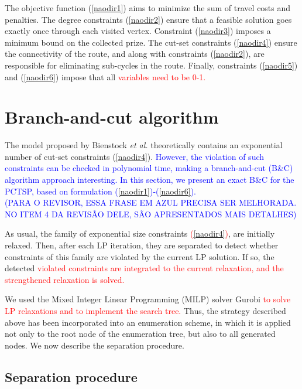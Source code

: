 \documentclass{ro}
\begin{document}
The objective function (\ref{naodir1}) aims to minimize the sum of travel costs and penalties. The degree constraints (\ref{naodir2}) ensure that a
feasible solution goes exactly once through each visited vertex. Constraint (\ref{naodir3}) imposes a minimum bound on the collected prize. The cut-set constraints (\ref{naodir4}) ensure the connectivity of the route, and along with constraints (\ref{naodir2}), are responsible for eliminating sub-cycles in the route. Finally, constraints (\ref{naodir5}) and (\ref{naodir6}) impose that all \textcolor{red}{variables need to be 0-1.}



\section{Branch-and-cut algorithm}
\label{sec:bc}


The model proposed by Bienstock \textit{et al.} \cite{bienstock1993note} theoretically contains an exponential number of cut-set constraints (\ref{naodir4}). \textcolor{blue}{However, the violation of such constraints can be checked in polynomial time, making a  branch-and-cut (B\&C) algorithm approach interesting. In this section, we present an  exact B\&C for the PCTSP, based on formulation (\ref{naodir1})-(\ref{naodir6}).}
\\[1em]
\textcolor{blue}{(PARA O REVISOR, ESSA FRASE EM AZUL PRECISA SER MELHORADA. NO ITEM 4 DA REVISÃO DELE, SÃO APRESENTADOS MAIS DETALHES)}

As usual, the family of exponential size constraints \textcolor{red}{(\ref{naodir4})}, are initially
relaxed. Then, after each LP iteration, they are separated
to detect whether constraints of this family are
violated by the current LP solution. If so, the detected \textcolor{red}{
violated constraints are integrated to the current relaxation, and the strengthened relaxation is solved.
}

We used the Mixed Integer Linear Programming (MILP) solver Gurobi \textcolor{red}{to solve LP relaxations and to implement the search tree.} Thus, the strategy described above has been incorporated into an enumeration scheme, in which it is applied not only to the root node of the enumeration tree, but also to all generated nodes. We now describe the separation procedure.

\subsection{Separation procedure}
\end{document}

